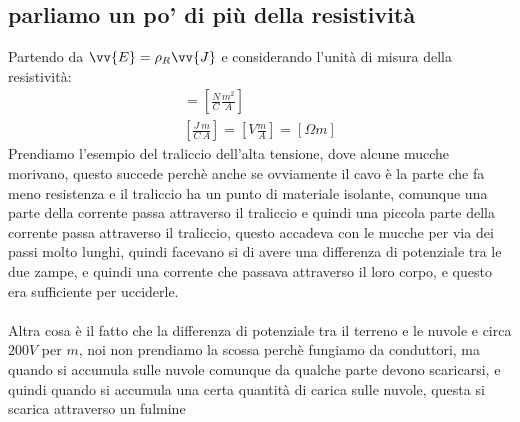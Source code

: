 \documentclass[a4paper, oneside]{article}
\begin{document}
\subsection{parliamo un po' di più della resistività}
Partendo da $\vv{E} = \rho_R \vv{J}$ e considerando l'unità di misura della resistività:
\begin{gather*}
    [\rho_R] = \left[\frac{N}{C} \frac{m^2}{A}\right] \\
    \left[ \frac{J \ m}{C \ A} \right] = \left[ V \frac{m}{A} \right] = \left[ \Omega m\right]   
\end{gather*}
Prendiamo l'esempio del traliccio dell'alta tensione, dove alcune mucche morivano, questo succede perchè anche se ovviamente il cavo è la parte che fa meno resistenza e il traliccio ha un punto di materiale isolante, comunque una parte 
della corrente passa attraverso il traliccio e quindi una piccola parte della corrente passa attraverso il traliccio, questo accadeva con le mucche per via dei passi molto lunghi, quindi 
facevano si di avere una differenza di potenziale tra le due zampe, e quindi una corrente che passava attraverso il loro corpo, e questo era sufficiente per ucciderle.\\
\hfill\\
Altra cosa è il fatto che la differenza di potenziale tra il terreno e le nuvole e circa $200 V$ per $m$, noi non prendiamo la scossa perchè fungiamo da conduttori, ma quando si accumula sulle nuvole comunque da qualche parte devono 
scaricarsi, e quindi quando si accumula una certa quantità di carica sulle nuvole, questa si scarica attraverso un fulmine\\
\end{document}
